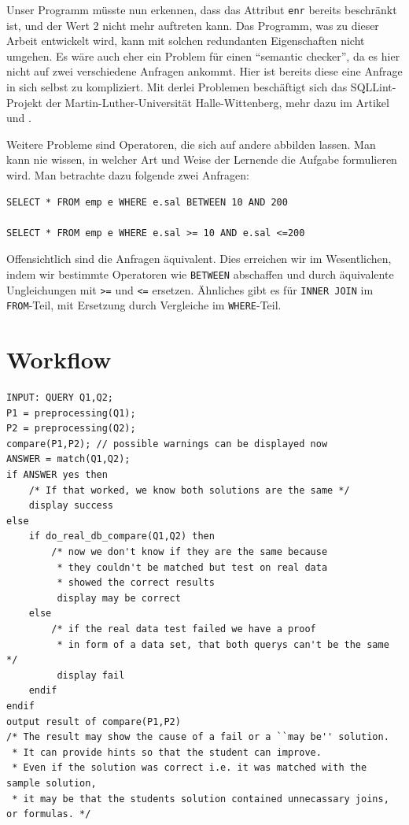 Unser Programm müsste nun erkennen, dass das Attribut \verb|enr| bereits beschränkt ist, und der Wert 2 nicht mehr auftreten kann. Das Programm, was zu dieser Arbeit entwickelt wird, kann mit solchen redundanten Eigenschaften nicht umgehen. Es wäre auch eher ein Problem für einen ``semantic checker'', da es hier nicht auf zwei verschiedene Anfragen ankommt. Hier ist bereits diese eine Anfrage in sich selbst zu kompliziert. Mit derlei Problemen beschäftigt sich das SQLLint-Projekt der Martin-Luther-Universität Halle-Wittenberg, mehr dazu im Artikel \cite{brass1} und \cite{brass2}.

Weitere Probleme sind Operatoren, die sich auf andere abbilden lassen. Man kann nie wissen, in welcher Art und Weise der Lernende die Aufgabe formulieren wird. Man betrachte dazu folgende zwei Anfragen:
\begin{verbatim}
SELECT * FROM emp e WHERE e.sal BETWEEN 10 AND 200

SELECT * FROM emp e WHERE e.sal >= 10 AND e.sal <=200
\end{verbatim}

Offensichtlich sind die Anfragen äquivalent. Dies erreichen wir im Wesentlichen, indem wir bestimmte Operatoren wie \verb|BETWEEN| abschaffen und durch äquivalente Ungleichungen mit \verb|>=| und \verb|<=| ersetzen. Ähnliches gibt es für \verb|INNER JOIN| im \verb|FROM|-Teil, mit Ersetzung durch Vergleiche im \verb|WHERE|-Teil. 

\section{Workflow}

\begin{verbatim}
INPUT: QUERY Q1,Q2;
P1 = preprocessing(Q1);
P2 = preprocessing(Q2);
compare(P1,P2); // possible warnings can be displayed now
ANSWER = match(Q1,Q2);
if ANSWER yes then
    /* If that worked, we know both solutions are the same */
    display success
else 
    if do_real_db_compare(Q1,Q2) then
        /* now we don't know if they are the same because
         * they couldn't be matched but test on real data 
         * showed the correct results 
         display may be correct
    else 
        /* if the real data test failed we have a proof 
         * in form of a data set, that both querys can't be the same */
         display fail
    endif
endif
output result of compare(P1,P2)
/* The result may show the cause of a fail or a ``may be'' solution. 
 * It can provide hints so that the student can improve.
 * Even if the solution was correct i.e. it was matched with the sample solution, 
 * it may be that the students solution contained unnecassary joins, or formulas. */
\end{verbatim}

